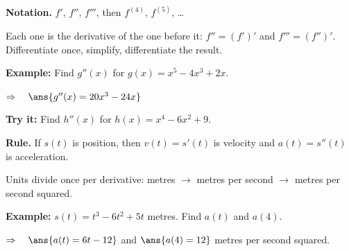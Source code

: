 \documentclass[12pt]{article}
\begin{document}


\begin{formulabox}
\textbf{Notation.} $f'$, $f''$, $f'''$, then $f^{(4)}$, $f^{(5)}$, \ldots\par
Each one is the derivative of the one before it: $f'' = (f')'$ and
$f''' = (f'')'$. Differentiate once, simplify, differentiate the result.
\end{formulabox}

\begin{examplebox}
\textbf{Example:} \quad Find $g''(x)$ for $g(x) = x^5 - 4x^3 + 2x$.

$\Rightarrow\quad \ans{g''(x) = 20x^3 - 24x}$
\end{examplebox}

\begin{tryitbox}
\textbf{Try it:} \quad Find $h''(x)$ for $h(x) = x^4 - 6x^2 + 9$.\\[2pt]
\end{tryitbox}


\begin{formulabox}
\textbf{Rule.} If $s(t)$ is position, then $v(t) = s'(t)$ is velocity and
$a(t) = s''(t)$ is acceleration.\par
Units divide once per derivative: metres $\rightarrow$ metres per second
$\rightarrow$ metres per second squared.
\end{formulabox}

\begin{examplebox}
\textbf{Example:} \quad $s(t) = t^3 - 6t^2 + 5t$ metres. Find $a(t)$ and $a(4)$.

$\Rightarrow\quad \ans{a(t) = 6t - 12}$ \quad and \quad $\ans{a(4) = 12}$ metres per second squared.
\end{examplebox}
\end{document}
